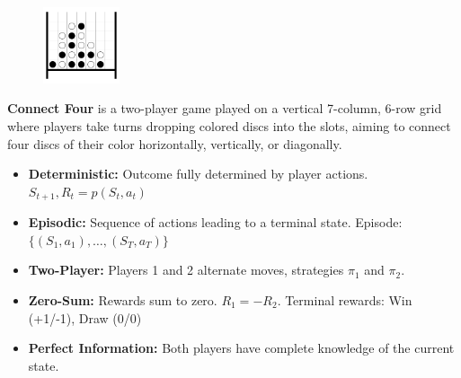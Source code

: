 \documentclass[aspectratio=169,xcolor=dvipsnames]{beamer}
\begin{document}
\begin{frame}{}
    \begin{figure}[h]
    \centering
    \includegraphics[width=0.2\textwidth]{intro2.png}
    \label{fig:intro}
\end{figure}
    \textbf{Connect Four} is a two-player game played on a vertical 7-column, 6-row grid where players take turns dropping colored discs into the slots, aiming to connect four discs of their color horizontally, vertically, or diagonally.
\end{frame}


\begin{frame}{}
\begin{itemize}
    \item \textbf{Deterministic:} Outcome fully determined by player actions. $S_{t+1}, R_{t} = p(S_t, a_t)$
    \item \textbf{Episodic:} Sequence of actions leading to a terminal state. Episode: $\{(S_1, a_1), \dots, (S_T, a_T)\}$
    \item \textbf{Two-Player:} Players 1 and 2 alternate moves, strategies $\pi_1$ and $\pi_2$. %
    \item \textbf{Zero-Sum:} Rewards sum to zero.  $R_1 = -R_2$. Terminal rewards: Win (+1/-1), Draw (0/0)
    \item \textbf{Perfect Information:} Both players have complete knowledge of the current state.
\end{itemize}
\end{frame}

\end{document}
